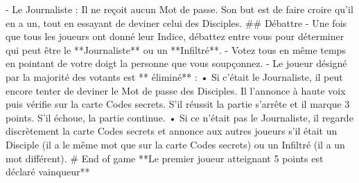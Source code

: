 \documentclass{article}%
\begin{document}
\newline%
{-} Le Journaliste : Il ne reçoit aucun Mot de passe. Son but est de faire croire qu’il en a un, tout en essayant
\newline%
de deviner celui des Disciples.
\newline%
 \#\# Débattre
\newline%
  {-} Une fois que tous les joueurs ont donné leur Indice, débattez entre vous pour déterminer qui peut
\newline%
être le **Journaliste** ou un **Infiltré**.
\newline%
{-} Votez tous en même temps en pointant de votre doigt la personne que vous soupçonnez.
\newline%
{-} Le joueur désigné par la majorité des votants est ** éliminé** :
\newline%
• Si c’était le Journaliste, il peut encore tenter de deviner le Mot de passe des Disciples. Il l'annonce
\newline%
à haute voix puis vérifie sur la carte Codes secrets. S’il réussit la partie s’arrête et il marque 3 points.
\newline%
S’il échoue, la partie continue.
\newline%
• Si ce n’était pas le Journaliste, il regarde discrètement la carte Codes secrets et annonce aux autres joueurs
\newline%
s’il était un Disciple (il a le même mot que sur la carte Codes secrets) ou un Infiltré (il a un mot différent).
\newline%
 \# End of game
\newline%
 **Le premier joueur atteignant 5 points est déclaré vainqueur**

%
\end{document}
